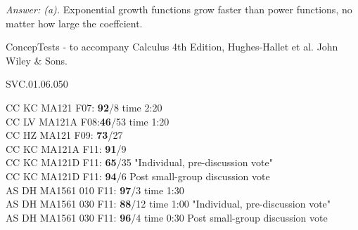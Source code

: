 {\it Answer: (a).} Exponential growth functions grow faster than power functions, no matter how large the coeffcient.

\medskip
ConcepTests - to accompany Calculus 4th Edition, Hughes-Hallet et al. John Wiley \& Sons.

SVC.01.06.050

CC KC MA121 F07: {\bf 92}/8 time 2:20\\
CC LV MA121A F08:{\bf46}/53 time 1:20\\
CC HZ MA121 F09: {\bf 73}/27  \\
CC KC MA121A F11: {\bf 91}/9  \\
CC KC MA121D F11: {\bf 65}/35 "Individual, pre-discussion vote" \\
CC KC MA121D F11: {\bf 94}/6 Post small-group discussion vote \\
AS DH MA1561 010 F11: {\bf 97}/3 time 1:30  \\
AS DH MA1561 030 F11: {\bf 88}/12 time 1:00 "Individual, pre-discussion vote" \\
AS DH MA1561 030 F11: {\bf 96}/4 time 0:30 Post small-group discussion vote \\
